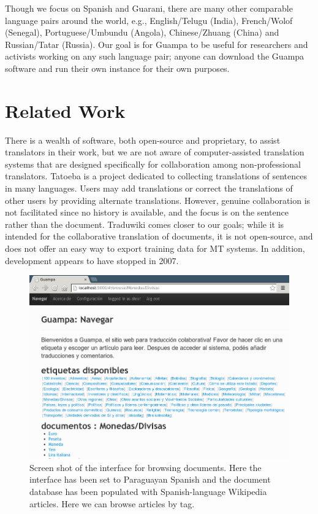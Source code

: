 \documentclass[10pt, a4paper]{article}
\begin{document}
Though we focus on Spanish and Guarani, there are many other comparable
language pairs around the world, e.g., English/Telugu (India), French/Wolof
(Senegal), Portuguese/Umbundu (Angola), Chinese/Zhuang (China) and
Russian/Tatar (Russia). Our goal is for Guampa to be useful for researchers and
activists working on any such language pair; anyone can download the Guampa
software and run their own instance for their own purposes.

\section{Related Work}
There is a wealth of software, both open-source and proprietary, to assist
translators in their work, but we are not aware of computer-assisted
translation systems that are designed specifically for collaboration among
non-professional translators. Tatoeba \cite{tatoeba} is a
project dedicated to collecting translations of sentences in many languages.
Users may add translations or correct the translations of other users by
providing alternate translations. However, genuine collaboration is not
facilitated since no history is available, and the focus is on the sentence
rather than the document. Traduwiki \cite{traduwiki} comes closer
to our goals; while it is intended for the collaborative translation of
documents, it is not open-source, and does not offer an easy way to export
training data for MT systems. In addition, development appears
to have stopped in 2007.

\begin{figure}
\includegraphics[width=17.13cm]{guampa-browse-cropped}
\caption{Screen shot of the interface for browsing documents. Here the
interface has been set to Paraguayan Spanish and the document database has been
populated with Spanish-language Wikipedia articles. Here we can browse articles
by tag.}
\end{figure}
\end{document}
